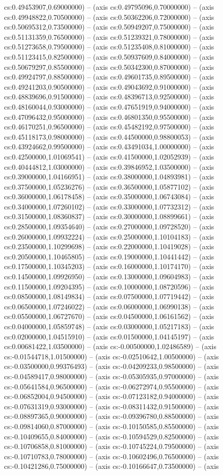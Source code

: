 cs:0.49453907,0.69000000) -- (axis cs:0.49795096,0.70000000) -- (axis cs:0.49948822,0.70500000) -- (axis cs:0.50362206,0.72000000) -- (axis cs:0.50695312,0.73500000) -- (axis cs:0.50949207,0.75000000) -- (axis cs:0.51131359,0.76500000) -- (axis cs:0.51239321,0.78000000) -- (axis cs:0.51273658,0.79500000) -- (axis cs:0.51235408,0.81000000) -- (axis cs:0.51123415,0.82500000) -- (axis cs:0.50937609,0.84000000) -- (axis cs:0.50679297,0.85500000) -- (axis cs:0.50342300,0.87000000) -- (axis cs:0.49924797,0.88500000) -- (axis cs:0.49601735,0.89500000) -- (axis cs:0.49241203,0.90500000) -- (axis cs:0.49043692,0.91000000) -- (axis cs:0.48839696,0.91500000) -- (axis cs:0.48396713,0.92500000) -- (axis cs:0.48160044,0.93000000) -- (axis cs:0.47651919,0.94000000) -- (axis cs:0.47096432,0.95000000) -- (axis cs:0.46801350,0.95500000) -- (axis cs:0.46170251,0.96500000) -- (axis cs:0.45482192,0.97500000) -- (axis cs:0.45118173,0.98000000) -- (axis cs:0.44500000,0.98800053) -- (axis cs:0.43924662,0.99500000) -- (axis cs:0.43491034,1.00000000) -- (axis cs:0.42500000,1.01069541) -- (axis cs:0.41500000,1.02052939) -- (axis cs:0.40444812,1.03000000) -- (axis cs:0.39846952,1.03500000) -- (axis cs:0.39000000,1.04166951) -- (axis cs:0.38000000,1.04893981) -- (axis cs:0.37500000,1.05236276) -- (axis cs:0.36500000,1.05877102) -- (axis cs:0.36000000,1.06178458) -- (axis cs:0.35000000,1.06743084) -- (axis cs:0.34000000,1.07260102) -- (axis cs:0.33000000,1.07732312) -- (axis cs:0.31500000,1.08360837) -- (axis cs:0.30000000,1.08899661) -- (axis cs:0.28500000,1.09354640) -- (axis cs:0.27000000,1.09728520) -- (axis cs:0.26000000,1.09932224) -- (axis cs:0.25000000,1.10104183) -- (axis cs:0.23500000,1.10299698) -- (axis cs:0.22000000,1.10419028) -- (axis cs:0.20500000,1.10465805) -- (axis cs:0.19000000,1.10441442) -- (axis cs:0.17500000,1.10345203) -- (axis cs:0.16000000,1.10174170) -- (axis cs:0.14500000,1.09926950) -- (axis cs:0.13000000,1.09604983) -- (axis cs:0.11500000,1.09204395) -- (axis cs:0.10000000,1.08720596) -- (axis cs:0.08500000,1.08149834) -- (axis cs:0.07500000,1.07719442) -- (axis cs:0.06500000,1.07246022) -- (axis cs:0.06000000,1.06990138) -- (axis cs:0.05500000,1.06727670) -- (axis cs:0.04500000,1.06161562) -- (axis cs:0.04000000,1.05859748) -- (axis cs:0.03000000,1.05217183) -- (axis cs:0.02000000,1.04515910) -- (axis cs:0.01500000,1.04145197) -- (axis cs:0.00681422,1.03500000) -- (axis cs:-0.00500000,1.02486589) -- (axis cs:-0.01544718,1.01500000) -- (axis cs:-0.02510642,1.00500000) -- (axis cs:-0.03500000,0.99376493) -- (axis cs:-0.04209233,0.98500000) -- (axis cs:-0.04589417,0.98000000) -- (axis cs:-0.05305935,0.97000000) -- (axis cs:-0.05641584,0.96500000) -- (axis cs:-0.06272974,0.95500000) -- (axis cs:-0.06852004,0.94500000) -- (axis cs:-0.07123182,0.94000000) -- (axis cs:-0.07631319,0.93000000) -- (axis cs:-0.08311432,0.91500000) -- (axis cs:-0.08897365,0.90000000) -- (axis cs:-0.09396780,0.88500000) -- (axis cs:-0.09814060,0.87000000) -- (axis cs:-0.10150585,0.85500000) -- (axis cs:-0.10409655,0.84000000) -- (axis cs:-0.10594529,0.82500000) -- (axis cs:-0.10706858,0.81000000) -- (axis cs:-0.10745224,0.79500000) -- (axis cs:-0.10710783,0.78000000) -- (axis cs:-0.10602496,0.76500000) -- (axis cs:-0.10421286,0.75000000) -- (axis cs:-0.10166647,0.73500000) -- (axis 